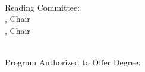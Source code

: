 \begin{titlepage}
    \begin{center}
        \large

        \hfill

        \vfill

        \begingroup
            \color{CTtitle}\spacedallcaps{\myTitle} \\ \bigskip
        \endgroup

        \spacedlowsmallcaps{\myName} \\ \bigskip \bigskip \bigskip \bigskip
        \bigskip \bigskip

        \mySubtitle \\ \medskip
        \myDegree \\ \medskip
        \myUni \\
        \myTime \\  \bigskip \bigskip \bigskip \bigskip
        \bigskip \bigskip

        Reading Committee: \\ \medskip
        \myChair, Chair \\ \medskip
        \myOtherChair, Chair \\ \medskip
        \myFaculty \\ \bigskip \bigskip \bigskip \bigskip
        \bigskip \bigskip

        Program Authorized to Offer Degree: \\ \medskip
        \myDepartment \\

        \vfill

    \end{center}
\end{titlepage}
